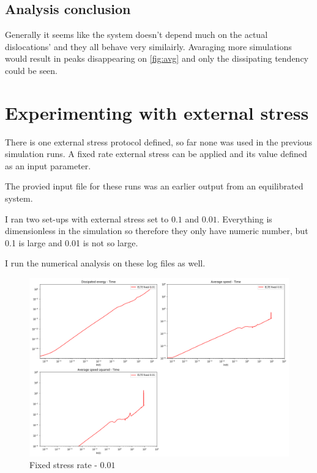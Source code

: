 \documentclass[12pt,a4paper]{article}
\theoremstyle{plain}
\begin{document}
\begin{multicols*}{2}
	\subsection{Analysis conclusion}

	\par Generally it seems like the system doesn't depend much on
	the actual dislocations' and they all behave very similairly. Avaraging
	more simulations would result in peaks disappearing on \ref{fig:avg} and only the dissipating
	tendency could be seen.

	\section{Experimenting with external stress}

	\par There is one external stress protocol defined, so far none was used in the previous simulation
	runs. A fixed rate external stress can be applied and its value defined as an input parameter.

	\par The provied input file for these runs was an earlier output from an equilibrated system.

	\par I ran two set-ups with external stress set to $0.1$ and $0.01$. Everything is dimensionless
	in the simulation so therefore they only have numeric number, but 0.1 is large and 0.01 is not so large.

	\par I run the numerical analysis on these log files as well.

	\begin{figure}[H]
		\centering
		\includegraphics[width=0.95\columnwidth]{all_elte_fixed_0_0_1.png}
		\caption{Fixed stress rate - $0.01$}
	\end{figure}


\end{multicols*}
\end{document}
